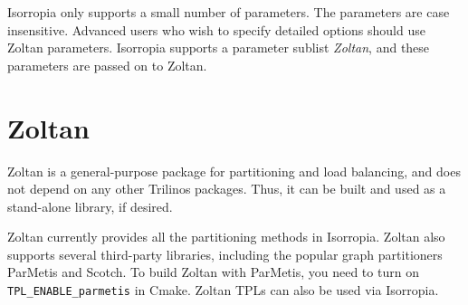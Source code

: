 Isorropia only supports a small number of parameters. The parameters are case insensitive.  Advanced users who wish to specify detailed options should use Zoltan parameters. Isorropia supports a parameter sublist \emph{Zoltan}, and these parameters are passed on to Zoltan.


\section{Zoltan}
\label{sec:zoltan}
Zoltan is a general-purpose package for partitioning and load balancing, and does not depend on any other Trilinos packages. Thus, it can be built and used as a stand-alone library, if desired.

Zoltan currently provides all the partitioning methods in Isorropia. Zoltan also supports several third-party libraries, including the popular graph partitioners ParMetis and Scotch. To build Zoltan with ParMetis, you need to turn on \texttt{TPL\_ENABLE\_parmetis} in Cmake. Zoltan TPLs can also be used via Isorropia.

